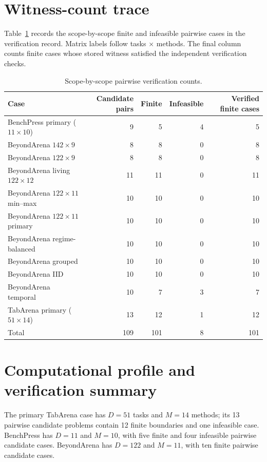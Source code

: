 \documentclass[11pt]{article}
\begin{document}
\section{Witness-count trace}
Table~\ref{tab:witness} records the scope-by-scope finite and infeasible pairwise cases in the verification record. Matrix labels follow tasks $\times$ methods. The final column counts finite cases whose stored witness satisfied the independent verification checks.

\begin{table}[htbp]
\centering
\caption{Scope-by-scope pairwise verification counts.}
\label{tab:witness}
\small
\begin{tabular}{lrrrr}
\toprule
Case & Candidate pairs & Finite & Infeasible & Verified finite cases\\
\midrule
BenchPress primary ($11\times10$) & 9 & 5 & 4 & 5\\
BeyondArena $142\times9$ & 8 & 8 & 0 & 8\\
BeyondArena $122\times9$ & 8 & 8 & 0 & 8\\
BeyondArena living $122\times12$ & 11 & 11 & 0 & 11\\
BeyondArena $122\times11$ min--max & 10 & 10 & 0 & 10\\
BeyondArena $122\times11$ primary & 10 & 10 & 0 & 10\\
BeyondArena regime-balanced & 10 & 10 & 0 & 10\\
BeyondArena grouped & 10 & 10 & 0 & 10\\
BeyondArena IID & 10 & 10 & 0 & 10\\
BeyondArena temporal & 10 & 7 & 3 & 7\\
TabArena primary ($51\times14$) & 13 & 12 & 1 & 12\\
\midrule
Total & 109 & 101 & 8 & 101\\
\bottomrule
\end{tabular}
\end{table}

\section{Computational profile and verification summary}
The primary TabArena case has $D=51$ tasks and $M=14$ methods; its 13 pairwise candidate problems contain 12 finite boundaries and one infeasible case. BenchPress has $D=11$ and $M=10$, with five finite and four infeasible pairwise candidate cases. BeyondArena has $D=122$ and $M=11$, with ten finite pairwise candidate cases.
\end{document}
